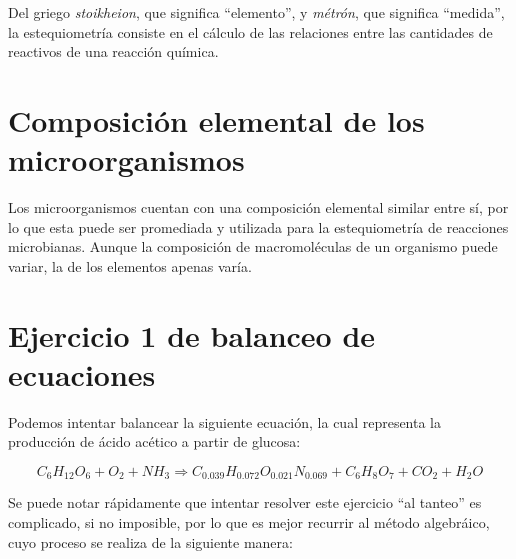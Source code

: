 


Del griego \textit{stoikheion}, que significa ``elemento'', y \textit{métrón}, que significa ``medida'', la estequiometría consiste en el cálculo de las relaciones entre las cantidades de reactivos de una reacción química.

\section{Composición elemental de los microorganismos}

Los microorganismos cuentan con una composición elemental similar entre sí, por lo que esta puede ser promediada y utilizada para la estequiometría de reacciones microbianas.
Aunque la composición de macromoléculas de un organismo puede variar, la de los elementos apenas varía. 

    

\section{Ejercicio 1 de balanceo de ecuaciones}

Podemos intentar balancear la siguiente ecuación, la cual representa la producción de ácido acético a partir de glucosa:


\begin{equation*}
    C_{6}H_{12}O_{6} + O_{2} + NH_{3} \Longrightarrow C_{0.039}H_{0.072}O_{0.021}N_{0.069} + C_{6}H_{8}O_{7} + CO_{2} + H_{2}O
\end{equation*}

Se puede notar rápidamente que intentar resolver este ejercicio ``al tanteo'' es complicado, si no imposible, por lo que es mejor recurrir al método algebráico, cuyo proceso se realiza de la siguiente manera:

